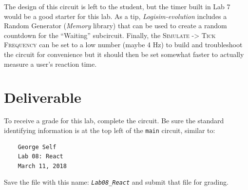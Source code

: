 The design of this circuit is left to the student, but the timer built in Lab 7 would be a good starter for this lab. As a tip, \textit{Logisim-evolution} includes a Random Generator (\textit{Memory} library) that can be used to create a random countdown for the ``Waiting'' subcircuit. Finally, the \textsc{Simulate -> Tick Frequency} can be set to a low number (maybe 4 Hz) to build and troubleshoot the circuit for convenience but it should then be set somewhat faster to actually measure a user's reaction time.

\section{Deliverable}

To receive a grade for this lab, complete the circuit. Be sure the standard identifying information is at the top left of the \lstinline{main} circuit, similar to: 

\bigskip
\begin{minipage}{\linewidth}
	\begin{verbatim}
	George Self
	Lab 08: React
	March 11, 2018
	\end{verbatim}
\end{minipage}
\bigskip

Save the file with this name: \emph{\texttt{Lab08\_React}} and submit that file for grading.

